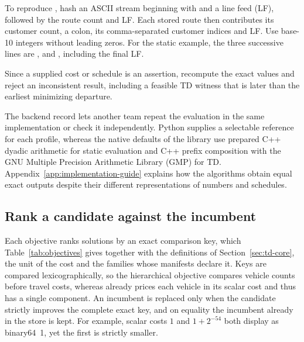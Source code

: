 To reproduce , hash an ASCII stream beginning with  and a line feed (LF), followed by the route count and LF. Each stored route then contributes its customer count, a colon, its comma-separated customer indices and LF. Use base-10 integers without leading zeros. For the static example, the three successive lines are ,  and , including the final LF.

Since a supplied cost or schedule is an assertion, recompute the exact values and reject an inconsistent result, including a feasible TD witness that is later than the earliest minimizing departure.

The backend record lets another team repeat the evaluation in the same implementation or check it independently. Python  supplies a selectable reference for each profile, whereas the native defaults of the library use prepared C++ dyadic arithmetic for static evaluation and C++ prefix composition with the GNU Multiple Precision Arithmetic Library (GMP) for TD. Appendix~\ref{app:implementation-guide} explains how the algorithms obtain equal exact outputs despite their different representations of numbers and schedules.

\subsection{Rank a candidate against the incumbent}

Each objective ranks solutions by an exact comparison key, which Table~\ref{tab:objectives} gives together with the definitions of Section~\ref{sec:td-core}, the unit of the cost and the families whose manifests declare it. Keys are compared lexicographically, so the hierarchical objective compares vehicle counts before travel costs, whereas  already prices each vehicle in its scalar cost and thus has a single component. An incumbent is replaced only when the candidate strictly improves the complete exact key, and on equality the incumbent already in the store is kept. For example, scalar costs $1$ and $1+2^{-54}$ both display as binary64~1, yet the first is strictly smaller.


